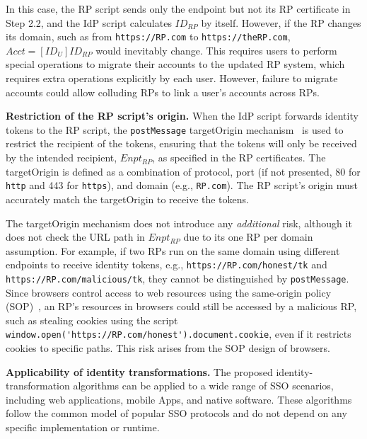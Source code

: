 In this case, the RP script sends only the endpoint but not its RP certificate in Step 2.2, and the IdP script calculates $ID_{RP}$ by itself. %
However, if the RP changes its domain, such as from \verb+https://RP.com+ to \verb+https://theRP.com+,
$Acct = [ID_U]ID_{RP}$ would inevitably change. This requires users to perform special operations to migrate their accounts to the updated RP system,
 which requires extra operations explicitly by each user.
 \textcolor[rgb]{1.00,0.00,0.00}{However, failure to migrate accounts could allow colluding RPs to link a user's accounts across RPs.}

\noindent \textbf{Restriction of the RP script's origin.}
When the IdP script forwards identity tokens to the RP script, the \verb+postMessage+ targetOrigin mechanism~\cite{postm-targeto} is used to restrict the recipient of the tokens, ensuring that the tokens will only be received by the intended recipient, $Enpt_{RP}$, as specified in the RP certificates. The targetOrigin is defined as a combination of protocol, port (if not presented, 80 for \verb+http+ and 443 for \verb+https+), and domain (e.g., \verb+RP.com+). The RP script's origin must accurately match the targetOrigin to receive the tokens.

The targetOrigin mechanism does not introduce any {\em additional} risk,
 although it does not check the URL path in $Enpt_{RP}$ %
\textcolor[rgb]{1.00,0.00,0.00}{due to its one RP per domain assumption.}
For example, if two RPs run on the same domain using different endpoints to receive identity tokens,
 e.g., \verb+https://RP.com/honest/tk+ and \verb+https://RP.com/malicious/tk+,
  they cannot be distinguished by \verb+postMessage+.
  Since browsers control access to web resources using the same-origin policy (SOP)~\cite{sop},
   an RP's resources in browsers could still be accessed by a malicious RP,
    such as stealing cookies using the script \verb+window.open('https://RP.com/honest').document.cookie+,
even if it restricts cookies to specific paths. This risk arises from the SOP design of browsers. %



\noindent \textbf{Applicability of identity transformations.}
The proposed identity-transformation algorithms %
can be applied to a wide range of SSO scenarios, including web applications, mobile Apps, and native software.
These algorithms follow the common model of popular SSO protocols and do not depend on any specific implementation or runtime.%



